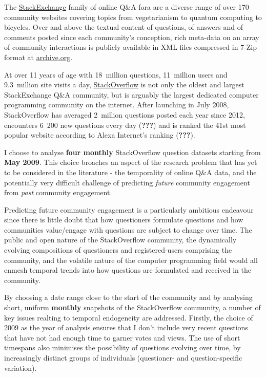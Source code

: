 \documentclass[11pt,preprint, authoryear]{article}
\numberwithin{equation}{section}
\begin{document}
The \href{https://stackexchange.com/sites\#traffic}{StackExchange}
family of online Q\&A fora are a diverse range of over 170 community
websites covering topics from vegetarianism to quantum computing to
bicycles. Over and above the textual content of questions, of answers
and of comments posted since each community's conception, rich meta-data
on an array of community interactions is publicly available in XML files
compressed in 7-Zip format at
\href{http://archive.org/download/stackexchange}{archive.org}.

At over 11 years of age with 18~million questions, 11~million users and
9.3~million site visits a day,
\href{https://stackoverflow.com}{StackOverflow} is not only the oldest
and largest StackExchange Q\&A community, but is arguably the largest
dedicated computer programming community on the internet. After
launching in July 2008, StackOverflow has averaged 2~million questions
posted each year since 2012, encounters 6~200 new questions every day
({\textbf{???}}) and is ranked the 41st most popular website according
to Alexa Internet's ranking ({\textbf{???}}).

I choose to analyse \textbf{four monthly} StackOverflow question
datasets starting from \textbf{May 2009}. This choice broaches an aspect
of the research problem that has yet to be considered in the literature
- the temporality of online Q\&A data, and the potentially very
difficult challenge of predicting \emph{future} community engagement
from \emph{past} community engagement.

Predicting future community engagement is a particularly ambitious
endeavour since there is little doubt that how questioners formulate
questions and how communities value/engage with questions are subject to
change over time. The public and open nature of the StackOverflow
community, the dynamically evolving compositions of questioners and
registered-users comprising the community, and the volatile nature of
the computer programming field would all enmesh temporal trends into how
questions are formulated and received in the community.

By choosing a date range close to the start of the community and by
analysing short, uniform \textbf{monthly} snapshots of the StackOverflow
community, a number of key issues realting to temporal endogeneity are
addressed. Firstly, the choice of 2009 as the year of analysis ensures
that I don't include very recent questions that have not had enough time
to garner votes and views. The use of short timespans also minimises the
possibility of questions evolving over time, by increasingly distinct
groups of individuals (questioner- and question-specific variation).
\end{document}
